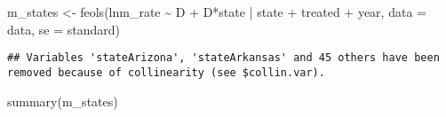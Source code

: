 \documentclass[
]{article}
\newenvironment{Shaded}{\begin{snugshade}}{\end{snugshade}}
\newcommand{\AttributeTok}[1]{\textcolor[rgb]{0.77,0.63,0.00}{#1}}
\newcommand{\FunctionTok}[1]{\textcolor[rgb]{0.00,0.00,0.00}{#1}}
\newcommand{\NormalTok}[1]{#1}
\newcommand{\OtherTok}[1]{\textcolor[rgb]{0.56,0.35,0.01}{#1}}
\newcommand{\SpecialCharTok}[1]{\textcolor[rgb]{0.00,0.00,0.00}{#1}}
\newcommand{\StringTok}[1]{\textcolor[rgb]{0.31,0.60,0.02}{#1}}
\begin{document}
\begin{Shaded}
\begin{Highlighting}[]
\NormalTok{m\_states }\OtherTok{\textless{}{-}} \FunctionTok{feols}\NormalTok{(lnm\_rate }\SpecialCharTok{\textasciitilde{}}\NormalTok{ D }\SpecialCharTok{+}\NormalTok{ D}\SpecialCharTok{*}\NormalTok{state }\SpecialCharTok{|}\NormalTok{ state }\SpecialCharTok{+}\NormalTok{ treated }\SpecialCharTok{+}\NormalTok{ year, }\AttributeTok{data =}\NormalTok{ data, }\AttributeTok{se =} \StringTok{\textquotesingle{}standard\textquotesingle{}}\NormalTok{)}
\end{Highlighting}
\end{Shaded}

\begin{verbatim}
## Variables 'stateArizona', 'stateArkansas' and 45 others have been removed because of collinearity (see $collin.var).
\end{verbatim}

\begin{Shaded}
\begin{Highlighting}[]
\FunctionTok{summary}\NormalTok{(m\_states)}
\end{Highlighting}
\end{Shaded}
\end{document}
